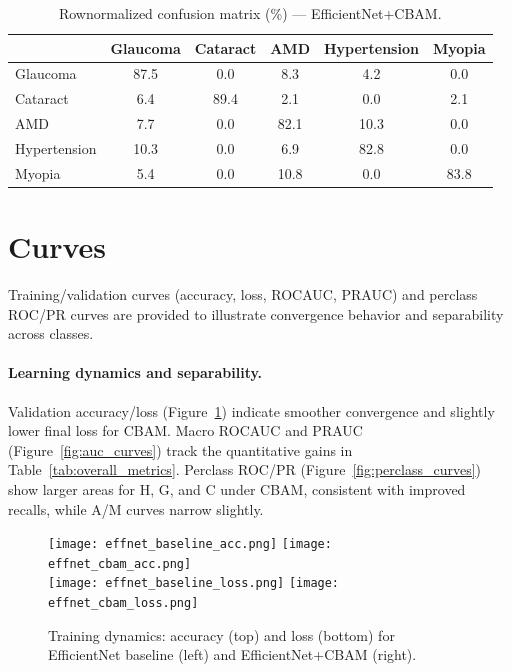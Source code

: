 \begin{table}[t]
  \centering
  \caption{Row\textendash normalized confusion matrix (\%) — EfficientNet+CBAM.}
  \label{tab:cm_cbam}
  \begin{tabular}{lccccc}
    \toprule
     & Glaucoma & Cataract & AMD & Hypertension & Myopia \\
    \midrule
    Glaucoma & 87.5 & 0.0 & 8.3 & 4.2 & 0.0 \\
    Cataract & 6.4 & 89.4 & 2.1 & 0.0 & 2.1 \\
    AMD & 7.7 & 0.0 & 82.1 & 10.3 & 0.0 \\
    Hypertension & 10.3 & 0.0 & 6.9 & 82.8 & 0.0 \\
    Myopia & 5.4 & 0.0 & 10.8 & 0.0 & 83.8 \\
    \bottomrule
  \end{tabular}
\end{table}

\section{Curves}\label{sec:results_figs}
Training/validation curves (accuracy, loss, ROC\textendash AUC, PR\textendash AUC) and per\textendash class ROC/PR curves are provided to illustrate convergence behavior and separability across classes.

\paragraph{Learning dynamics and separability.}
Validation accuracy/loss (Figure~\ref{fig:train_curves}) indicate smoother convergence and slightly lower final loss for CBAM. Macro ROC\textendash AUC and PR\textendash AUC (Figure~\ref{fig:auc_curves}) track the quantitative gains in Table~\ref{tab:overall_metrics}. Per\textendash class ROC/PR (Figure~\ref{fig:perclass_curves}) show larger areas for H, G, and C under CBAM, consistent with improved recalls, while A/M curves narrow slightly.

\begin{figure}[H]
  \centering
  \texttt{[image: effnet\_baseline\_acc.png]}
  \texttt{[image: effnet\_cbam\_acc.png]}\\
  \texttt{[image: effnet\_baseline\_loss.png]}
  \texttt{[image: effnet\_cbam\_loss.png]}
  \caption{Training dynamics: accuracy (top) and loss (bottom) for EfficientNet baseline (left) and EfficientNet+CBAM (right).}
  \label{fig:train_curves}
\end{figure}

